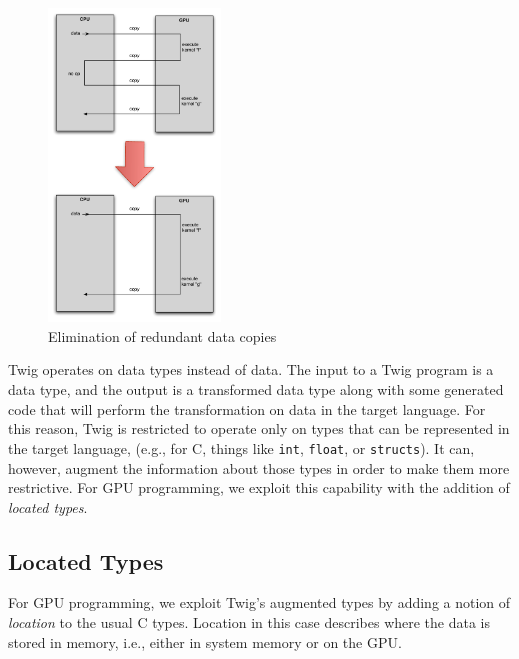 \begin{figure}[ht]
\label{basic-idea}
\begin{center}
\includegraphics[width=1.8in]{images/basic-idea}
\caption{Elimination of redundant data copies}
\end{center}
\end{figure}

Twig operates on data types instead of data. The input to a Twig program is a
data type, and the output is a transformed data type along with some generated
code that will perform the transformation on data in the target language. For
this reason, Twig is restricted to operate only on types that can be represented
in the target language, (e.g., for C, things like \texttt{int}, \texttt{float},
or \texttt{structs}). It can, however, augment the information about those types
in order to make them more restrictive. For GPU programming, we exploit this
capability with the addition of \emph{located types}.


\subsection{Located Types}
\label{sec:located-types}


For GPU programming, we exploit Twig's augmented types by adding a notion of
\emph{location} to the usual C types. Location in this case describes where the
data is stored in memory, i.e., either in system memory or on the GPU.

